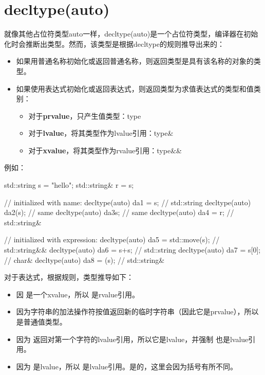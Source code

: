 \section{decltype(auto)}
就像其他占位符类型auto一样，decltype(auto)是一个占位符类型，编译器在初始化时会推断出类型。然而，该类型是根据decltype的规则推导出来的：

\begin{itemize}
	\item 如果用普通名称初始化或返回普通名称，则返回类型是具有该名称的对象的类型。
	\item 如果使用表达式初始化或返回表达式，则返回类型为求值表达式的类型和值类别：
	\begin{itemize}
		\item 对于\textbf{prvalue}，只产生值类型：type
		\item 对于\textbf{lvalue}，将其类型作为lvalue引用：type\&
		\item 对于\textbf{xvalue}，将其类型作为rvalue引用：type\&\&
	\end{itemize}
\end{itemize}

例如：

\begin{cppcode}
std::string s = "hello";
std::string& r = s;

// initialized with name:
decltype(auto) da1 = s; // std::string
decltype(auto) da2(s); // same
decltype(auto) da3{s}; // same
decltype(auto) da4 = r; // std::string&

// initialized with expression:
decltype(auto) da5 = std::move(s); // std::string&&
decltype(auto) da6 = s+s; // std::string
decltype(auto) da7 = s[0]; // char&
decltype(auto) da8 = (s); // std::string&
\end{cppcode}

对于表达式，根据规则，类型推导如下：

\begin{itemize}
	\item 因  是一个xvalue，所以  是rvalue引用。
	\item 因为字符串的加法操作符按值返回新的临时字符串（因此它是prvalue），所以  是普通值类型。
	\item 因为  返回对第一个字符的lvalue引用，所以它是lvalue，并强制  也是lvalue引用。
	\item 因为  是lvalue，所以  是lvalue引用。是的，这里会因为括号有所不同。
\end{itemize}

